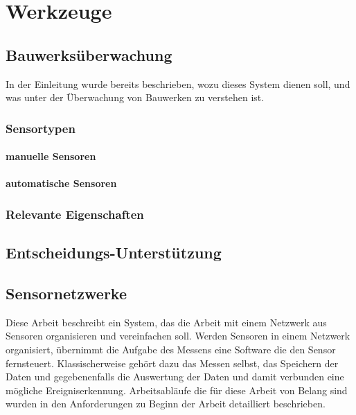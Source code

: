 \chapter{Werkzeuge}

\section{Bauwerksüberwachung}
In der Einleitung wurde bereits beschrieben, wozu dieses System dienen soll, und was unter der Überwachung von Bauwerken zu verstehen ist. 

\subsection{Sensortypen}
\subsubsection{manuelle Sensoren}
\subsubsection{automatische Sensoren}
\subsection{Relevante Eigenschaften}

\section{Entscheidungs-Unterstützung}

\section{Sensornetzwerke}
Diese Arbeit beschreibt ein System, das die Arbeit mit einem Netzwerk aus Sensoren organisieren und vereinfachen soll. Werden Sensoren in einem Netzwerk organisiert, übernimmt die Aufgabe des Messens eine Software die den Sensor fernsteuert. Klassischerweise gehört dazu das Messen selbst, das Speichern der Daten und gegebenenfalls die Auswertung der Daten und damit verbunden eine mögliche Ereigniserkennung. Arbeitsabläufe die für diese Arbeit von Belang sind wurden in den Anforderungen zu Beginn der Arbeit detailliert beschrieben. 

